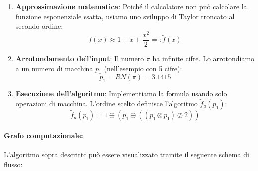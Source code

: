\documentclass[a4paper,12pt]{article}
\begin{document}
	\begin{enumerate}
		\item \textbf{Approssimazione matematica}: Poiché il calcolatore non può calcolare la funzione esponenziale esatta, usiamo uno sviluppo di Taylor troncato al secondo ordine:
		\[ f(x) \approx 1 + x + \frac{x^2}{2} =: \tilde{f}(x) \]
		
		\item \textbf{Arrotondamento dell'input}: Il numero $\pi$ ha infinite cifre. Lo arrotondiamo a un numero di macchina $p_1$ (nell'esempio con 5 cifre):
		\[ p_1 = RN(\pi) = 3.1415 \]
		
		\item \textbf{Esecuzione dell'algoritmo}: Implementiamo la formula usando solo operazioni di macchina. L'ordine scelto definisce l'algoritmo $\tilde{f}_a(p_1)$:
		\[ \tilde{f}_a(p_1) = 1 \oplus \left( p_1 \oplus \left( (p_1 \otimes p_1) \oslash 2 \right) \right) \]
	\end{enumerate}
	\paragraph{Grafo computazionale:}
	L'algoritmo sopra descritto può essere visualizzato tramite il seguente schema di flusso:
	
	\begin{center}
	\end{center}
\end{document}
